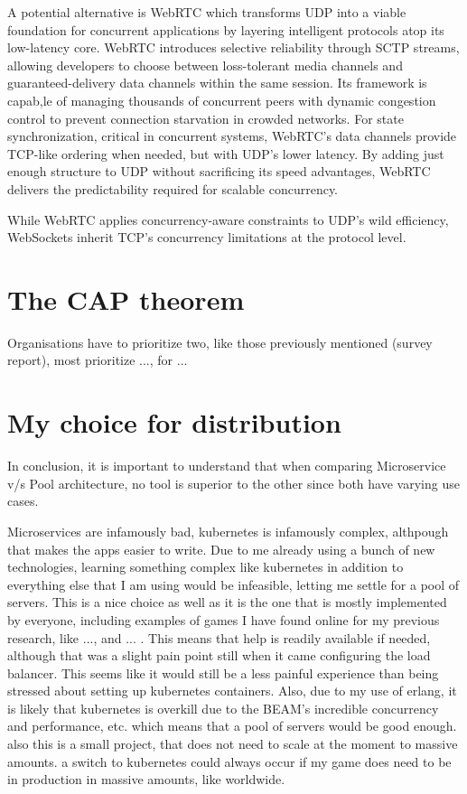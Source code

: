 \documentclass[]{final}
\begin{document}
A potential alternative is
WebRTC which transforms UDP into a viable foundation for concurrent
applications by
layering intelligent protocols atop its low-latency core.
WebRTC introduces selective reliability through SCTP streams, allowing
developers to choose between loss-tolerant media channels and
guaranteed-delivery data channels within the same session. Its framework
is capab,le of managing thousands of concurrent peers with dynamic
congestion control to prevent connection starvation in
crowded networks. For state synchronization, critical in concurrent systems,
WebRTC's data channels provide TCP-like ordering when needed, but with UDP's
lower latency. By
adding just enough structure to UDP without sacrificing its speed advantages,
WebRTC delivers the predictability required for scalable concurrency.

While WebRTC applies concurrency-aware constraints to UDP's wild efficiency,
WebSockets inherit TCP's concurrency limitations at the protocol level.

\section{The CAP theorem}

Organisations have to prioritize two, like those previously mentioned (survey
report), most prioritize ..., for ...

\section{My choice for distribution}


In conclusion, it is important to understand that when comparing Microservice v/s Pool architecture, no tool is superior to the other since both have varying use cases.

Microservices are infamously bad, kubernetes is infamously complex, althpough
that makes the apps easier to write. Due to me already using a bunch of new
technologies, learning something complex like kubernetes in addition to
everything else that I am using would be infeasible, letting me settle for
a pool of servers. This is a nice choice as well as it is the one that
is mostly implemented by everyone, including examples of games I have found
online for my previous research, like ..., and ... . This means that help
is readily available if needed, although that was a slight pain point still
when it came configuring the load balancer. This seems like it would still
be a less painful experience than being stressed about setting up kubernetes
containers. Also, due to my use of erlang, it is likely that kubernetes is
overkill due to the BEAM's incredible concurrency and performance, etc. which
means that a pool of servers would be good enough. also this is a small project,
that does not need to scale at the moment to massive amounts.
a switch to kubernetes could always occur if my game does need to be in
production in massive amounts, like worldwide.
\end{document}
